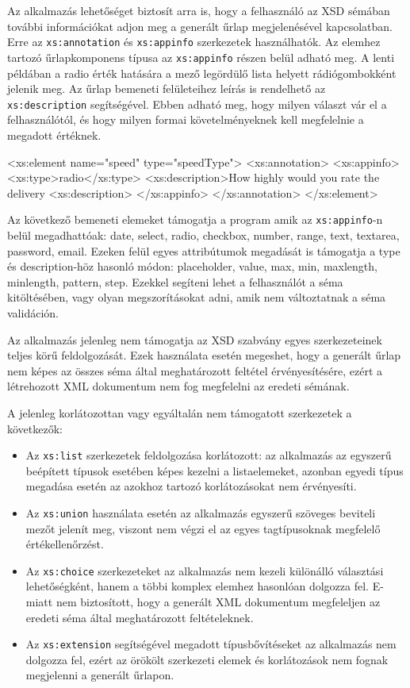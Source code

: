 Az alkalmazás lehetőséget biztosít arra is, hogy a felhasználó az XSD sémában további információkat adjon meg a generált űrlap megjelenésével kapcsolatban. Erre az \texttt{xs:annotation} és \texttt{xs:appinfo} szerkezetek használhatók. Az elemhez tartozó űrlapkomponens típusa az \texttt{xs:appinfo} részen belül adható meg. A lenti példában a radio érték hatására a mező legördülő lista helyett rádiógombokként jelenik meg. Az űrlap bemeneti felületeihez leírás is rendelhető az \texttt{xs:description} segítségével. Ebben adható meg, hogy milyen választ vár el a felhasználótól, és hogy milyen formai követelményeknek kell megfelelnie a megadott értéknek. 
\begin{java}
<xs:element name="speed" type="speedType">
 <xs:annotation>
  <xs:appinfo>
   <xs:type>radio</xs:type>
   <xs:description>How highly would you rate the delivery
   <xs:description>
  </xs:appinfo>
 </xs:annotation>
</xs:element>
\end{java}
Az következő bemeneti elemeket támogatja a program amik az \texttt{xs:appinfo}-n belül megadhattóak: date, select, radio, checkbox, number, range, text, textarea, password, email. Ezeken felül egyes attribútumok megadását is támogatja a type és description-höz hasonló módon: placeholder, value, max, min, maxlength, minlength, pattern, step. Ezekkel segíteni lehet a felhasználót a séma kitöltésében, vagy olyan megszorításokat adni, amik nem változtatnak a séma validáción.

Az alkalmazás jelenleg nem támogatja az XSD szabvány egyes szerkezeteinek teljes körű feldolgozását. Ezek használata esetén megeshet, hogy a generált űrlap nem képes az összes séma által meghatározott feltétel érvényesítésére, ezért a létrehozott XML dokumentum nem fog megfelelni az eredeti sémának.

A jelenleg korlátozottan vagy egyáltalán nem támogatott szerkezetek a következők:
\begin{itemize}
\item Az \texttt{xs:list} szerkezetek feldolgozása korlátozott: az alkalmazás az egyszerű beépített típusok esetében képes kezelni a listaelemeket, azonban egyedi típus megadása esetén az azokhoz tartozó korlátozásokat nem érvényesíti.
\item Az \texttt{xs:union} használata esetén az alkalmazás egyszerű szöveges beviteli mezőt jelenít meg, viszont nem végzi el az egyes tagtípusoknak megfelelő értékellenőrzést.
\item Az \texttt{xs:choice} szerkezeteket az alkalmazás nem kezeli különálló választási lehetőségként, hanem a többi komplex elemhez hasonlóan dolgozza fel. E-miatt nem biztosított, hogy a generált XML dokumentum megfeleljen az eredeti séma által meghatározott feltételeknek.
\item Az \texttt{xs:extension} segítségével megadott típusbővítéseket az alkalmazás nem dolgozza fel, ezért az örökölt szerkezeti elemek és korlátozások nem fognak megjelenni a generált űrlapon.
\end{itemize}


